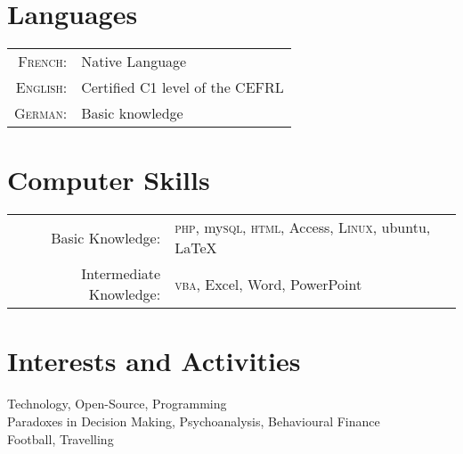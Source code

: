 \documentclass[a4paper,10pt]{article}
\begin{document}
\section{Languages}
\begin{tabular}{rl}
	\textsc{French:}&Native Language\\
	\textsc{English:}&Certified C1 level of the CEFRL\\
	\textsc{German:}&Basic knowledge
\end{tabular}

\section{Computer Skills}
\begin{tabular}{rl}
	Basic Knowledge:& \textsc{php}, my\textsc{sql}, \textsc{html}, Access, \textsc{Linux}, ubuntu, {\fb \LaTeX}\setmainfont[Path = /usr/share/fonts/Fontin/,SmallCapsFont=Fontin-SmallCaps.otf]{Fontin.otf}\\
	Intermediate Knowledge:& \textsc{vba}, Excel, Word, PowerPoint\\
\end{tabular}

\section{Interests and Activities}
Technology, Open-Source, Programming\\
Paradoxes in Decision Making, Psychoanalysis, Behavioural Finance\\
Football, Travelling
\end{document}
